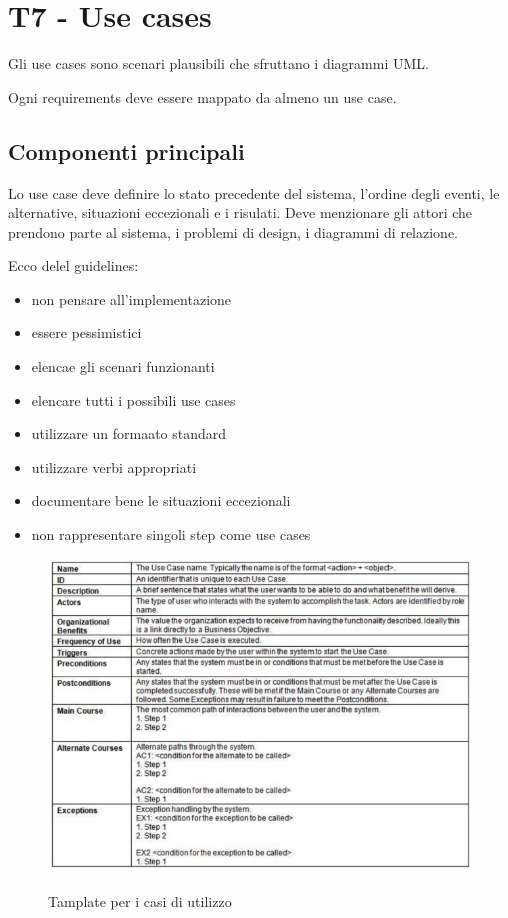 \documentclass{article}
\begin{document}
\section{T7 - Use cases}

Gli use cases sono scenari plausibili che sfruttano i diagrammi UML.

Ogni requirements deve essere mappato da almeno un use case.


\subsection{Componenti principali}
Lo use case deve definire lo stato precedente del sistema,
l'ordine degli eventi, le alternative, situazioni eccezionali e i risulati.
Deve menzionare gli attori che prendono parte al sistema, i problemi di design,
i diagrammi di relazione. 

Ecco delel guidelines:
\begin{itemize}
    \item non pensare all'implementazione
    \item essere pessimistici
    \item elencae gli scenari funzionanti
    \item elencare tutti i possibili use cases
    \item utilizzare un formaato standard
    \item utilizzare verbi appropriati
    \item documentare bene le situazioni eccezionali
    \item non rappresentare singoli step come use cases
\end{itemize}



\begin{figure}[h!]
    \centering
    \includegraphics[width=0.6\linewidth]{imgs/8 - use case template.png}
    \label{fig:use_case}
    \caption{Tamplate per i casi di utilizzo}
\end{figure}
\end{document}
